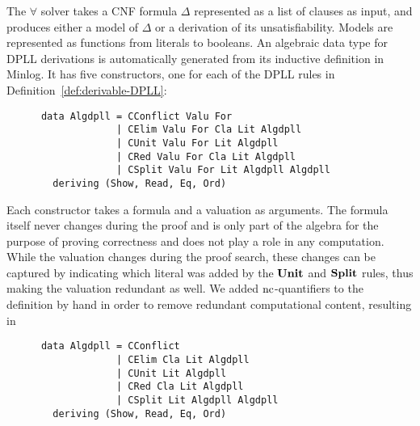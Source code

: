 %
%
The $\forall$ solver takes a CNF formula $\Delta$ represented as a list of
clauses as input, and produces either a model of $\Delta$ or a
derivation of its unsatisfiability.
%
%
Models are represented as functions from literals to booleans. An
algebraic data type for DPLL derivations is automatically generated
from its inductive definition in Minlog. It has five constructors, one
for each of the DPLL rules in Definition~\ref{def:derivable-DPLL}:
\begin{verbatim}
      data Algdpll = CConflict Valu For
                   | CElim Valu For Cla Lit Algdpll
                   | CUnit Valu For Lit Algdpll
                   | CRed Valu For Cla Lit Algdpll
                   | CSplit Valu For Lit Algdpll Algdpll
        deriving (Show, Read, Eq, Ord)
\end{verbatim}
%
Each constructor takes a formula and a valuation as arguments. The
formula itself never changes during the proof and is only part of the algebra for the purpose of proving correctness and does not play a role in any computation. While the valuation changes
during the proof search, these changes can be captured by indicating
which literal was added by the $\mathbf{Unit}$ and $\mathbf{Split}$ rules, thus making
the valuation redundant as well.  We added $\mathrm{nc}$-quantifiers to the
definition by hand in order to remove redundant
computational content, resulting in
%
\begin{verbatim}
      data Algdpll = CConflict
                   | CElim Cla Lit Algdpll
                   | CUnit Lit Algdpll
                   | CRed Cla Lit Algdpll
                   | CSplit Lit Algdpll Algdpll
        deriving (Show, Read, Eq, Ord)
\end{verbatim}
%
%

